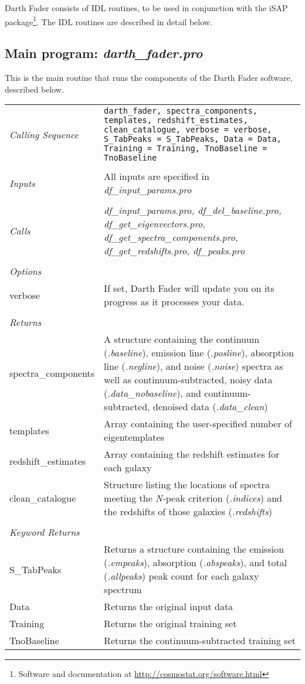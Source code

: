 \documentclass[a4paper]{article}
\newcommand{\lline}{\vspace{\baselineskip}\vspace{-\parskip}}
\begin{document}
Darth Fader consists of IDL routines, to be used in conjunction with the iSAP package\footnote{Software and documentation at \url{http://cosmostat.org/software.html}}. The IDL routines are described in detail below.

\setcounter{subsection}{-1}
\subsection{Main program: {\em darth\_fader.pro}}

This is the main routine that runs the components of the Darth Fader software, described below. 

\lline
\noindent\begin{tabularx}{\textwidth}{LI}
{\em Calling Sequence} & \texttt{darth\_fader, spectra\_components, templates, redshift\_estimates, clean\_catalogue, verbose = verbose, S\_TabPeaks = S\_TabPeaks, Data = Data, Training = Training, TnoBaseline = TnoBaseline}\\
 & \\
{\em Inputs} & All inputs are specified in {\em df\_input\_params.pro}\\
 & \\
{\em Calls} & {\em df\_input\_params.pro, df\_del\_baseline.pro, df\_get\_eigenvectors.pro, df\_get\_spectra\_components.pro, df\_get\_redshifts.pro, df\_peaks.pro} \\
  & \\
{\em Options} & \\
verbose & If set, Darth Fader will update you on its progress as it processes your data. \\
  & \\
{\em Returns} & \\
spectra\_components & A structure containing the continuum ({\em .baseline}), emission line ({\em .posline}), absorption line ({\em .negline}), and noise ({\em .noise}) spectra as well as continuum-subtracted, noisy data ({\em .data\_nobaseline}), and continuum-subtracted, denoised data ({\em .data\_clean}) \\
templates & Array containing the user-specified number of eigentemplates \\
redshift\_estimates & Array containing the redshift estimates for each galaxy \\
clean\_catalogue & Structure listing the locations of spectra meeting the {\em N-}peak criterion ({\em .indices}) and the redshifts of those galaxies ({\em .redshifts}) \\
 & \\
{\em Keyword Returns} & \\
S\_TabPeaks & Returns a structure containing the emission ({\em .empeaks}), absorption ({\em .abspeaks}), and total ({\em .allpeaks}) peak count for each galaxy spectrum \\
Data & Returns the original input data \\
Training & Returns the original training set \\
TnoBaseline & Returns the continuum-subtracted training set 
\end{tabularx}
\end{document}
